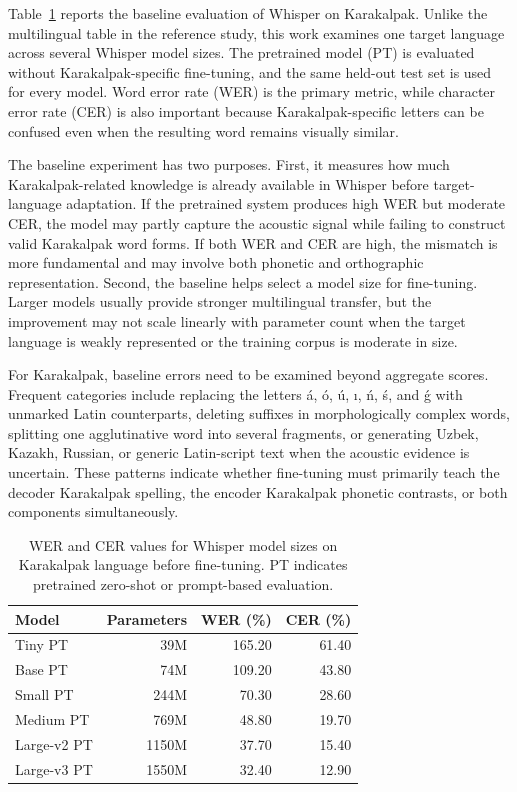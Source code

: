 \documentclass[11pt]{article}
\begin{document}
Table~\ref{tab:baseline-family} reports the baseline evaluation of Whisper on Karakalpak. Unlike the multilingual table in the reference study, this work examines one target language across several Whisper model sizes. The pretrained model (PT) is evaluated without Karakalpak-specific fine-tuning, and the same held-out test set is used for every model. Word error rate (WER) is the primary metric, while character error rate (CER) is also important because Karakalpak-specific letters can be confused even when the resulting word remains visually similar.

The baseline experiment has two purposes. First, it measures how much Karakalpak-related knowledge is already available in Whisper before target-language adaptation. If the pretrained system produces high WER but moderate CER, the model may partly capture the acoustic signal while failing to construct valid Karakalpak word forms. If both WER and CER are high, the mismatch is more fundamental and may involve both phonetic and orthographic representation. Second, the baseline helps select a model size for fine-tuning. Larger models usually provide stronger multilingual transfer, but the improvement may not scale linearly with parameter count when the target language is weakly represented or the training corpus is moderate in size.

For Karakalpak, baseline errors need to be examined beyond aggregate scores. Frequent categories include replacing the letters á, ó, ú, ı, ń, ś, and ǵ with unmarked Latin counterparts, deleting suffixes in morphologically complex words, splitting one agglutinative word into several fragments, or generating Uzbek, Kazakh, Russian, or generic Latin-script text when the acoustic evidence is uncertain. These patterns indicate whether fine-tuning must primarily teach the decoder Karakalpak spelling, the encoder Karakalpak phonetic contrasts, or both components simultaneously.

\begin{table}[H]
\centering
\caption{WER and CER values for Whisper model sizes on Karakalpak language before fine-tuning. PT indicates pretrained zero-shot or prompt-based evaluation.}
\label{tab:baseline-family}
\begin{tabular}{lrrr}
\toprule
Model & Parameters & WER (\%) & CER (\%) \\
\midrule
Tiny PT & 39M & 165.20 & 61.40 \\
Base PT & 74M & 109.20 & 43.80 \\
Small PT & 244M & 70.30 & 28.60 \\
Medium PT & 769M & 48.80 & 19.70 \\
Large-v2 PT & 1150M & 37.70 & 15.40 \\
Large-v3 PT & 1550M & 32.40 & 12.90 \\
\bottomrule
\end{tabular}
\end{table}
\end{document}
